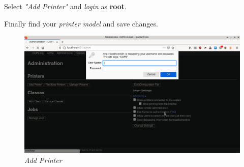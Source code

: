 \documentclass[12pt, a4paper]{article}
\begin{document}
\begin{large}
	Select \emph{"Add Printer"} and \emph{login} as \textbf{root}.\\
	\par Finally find your \emph{printer model} and save changes.
	\captionsetup[figure]{labelformat=empty}
	\begin{figure}[h!]
		\includegraphics[scale=0.25]{cups-3}
		\caption{\emph{Add Printer}}
	\end{figure}
\end{large}
\end{document}
